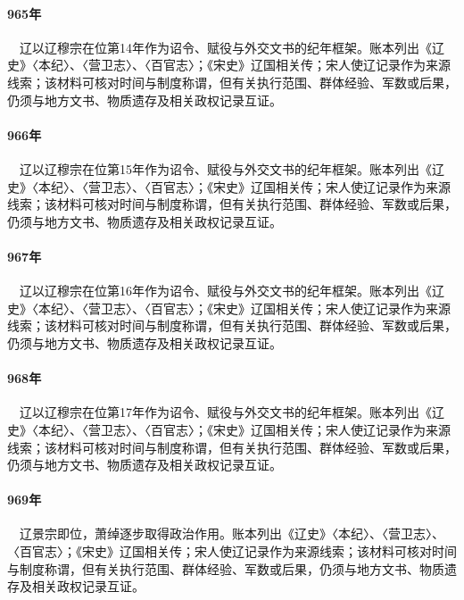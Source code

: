 \paragraph{965年}　辽以辽穆宗在位第14年作为诏令、赋役与外交文书的纪年框架。账本列出《辽史》〈本纪〉、〈营卫志〉、〈百官志〉；《宋史》辽国相关传；宋人使辽记录作为来源线索；该材料可核对时间与制度称谓，但有关执行范围、群体经验、军数或后果，仍须与地方文书、物质遗存及相关政权记录互证。

\paragraph{966年}　辽以辽穆宗在位第15年作为诏令、赋役与外交文书的纪年框架。账本列出《辽史》〈本纪〉、〈营卫志〉、〈百官志〉；《宋史》辽国相关传；宋人使辽记录作为来源线索；该材料可核对时间与制度称谓，但有关执行范围、群体经验、军数或后果，仍须与地方文书、物质遗存及相关政权记录互证。

\paragraph{967年}　辽以辽穆宗在位第16年作为诏令、赋役与外交文书的纪年框架。账本列出《辽史》〈本纪〉、〈营卫志〉、〈百官志〉；《宋史》辽国相关传；宋人使辽记录作为来源线索；该材料可核对时间与制度称谓，但有关执行范围、群体经验、军数或后果，仍须与地方文书、物质遗存及相关政权记录互证。

\paragraph{968年}　辽以辽穆宗在位第17年作为诏令、赋役与外交文书的纪年框架。账本列出《辽史》〈本纪〉、〈营卫志〉、〈百官志〉；《宋史》辽国相关传；宋人使辽记录作为来源线索；该材料可核对时间与制度称谓，但有关执行范围、群体经验、军数或后果，仍须与地方文书、物质遗存及相关政权记录互证。

\paragraph{969年}　辽景宗即位，萧绰逐步取得政治作用。账本列出《辽史》〈本纪〉、〈营卫志〉、〈百官志〉；《宋史》辽国相关传；宋人使辽记录作为来源线索；该材料可核对时间与制度称谓，但有关执行范围、群体经验、军数或后果，仍须与地方文书、物质遗存及相关政权记录互证。


